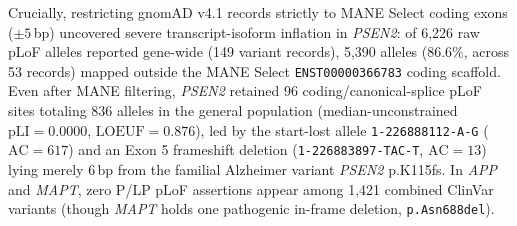 \documentclass[11pt,a4paper]{article}
\begin{document}
\begin{table}[!htb]
\centering
\caption{Five-gene GRCh38 MANE Select architecture, gnomAD v4.1 constraint (total versus MANE-restricted pLoFs), ClinVar pathogenicity breakdown, and AlphaGenome stop-gain splicing summary.}
\label{tab:five_gene_overview}
\footnotesize
\setlength{\tabcolsep}{3pt}
\end{table}

Crucially, restricting gnomAD v4.1 records strictly to MANE Select coding exons ($\pm 5$\,bp) uncovered severe transcript-isoform inflation in \textit{PSEN2}: of 6,226 raw pLoF alleles reported gene-wide (149 variant records), 5,390 alleles (86.6\%, across 53 records) mapped outside the MANE Select \texttt{ENST00000366783} coding scaffold. Even after MANE filtering, \textit{PSEN2} retained 96 coding/canonical-splice pLoF sites totaling 836 alleles in the general population (median-unconstrained $\mathrm{pLI}=0.0000$, $\mathrm{LOEUF}=0.876$), led by the start-lost allele \texttt{1-226888112-A-G} ($\mathrm{AC}=617$) and an Exon 5 frameshift deletion (\texttt{1-226883897-TAC-T}, $\mathrm{AC}=13$) lying merely 6\,bp from the familial Alzheimer variant \textit{PSEN2} p.K115fs. In \textit{APP} and \textit{MAPT}, zero P/LP pLoF assertions appear among 1,421 combined ClinVar variants (though \textit{MAPT} holds one pathogenic in-frame deletion, \texttt{p.Asn688del}).
\end{document}
